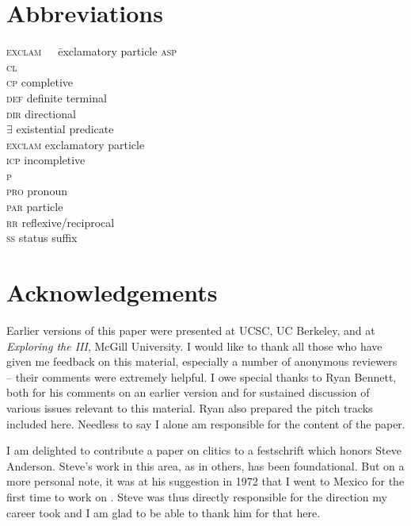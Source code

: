 \documentclass[output=paper,
modfonts
]{LSP/langsci}
\begin{document}
\section*{Abbreviations}
\begin{multicols}{2}
\begin{tabbing}
\textsc{exclam}~~~\= exclamatory particle \kill
\textsc{asp}\>  \\
\textsc{cl}\> \\
\textsc{cp}\> completive \\
\textsc{def}\> definite terminal \\
\textsc{dir}\> directional \\
$\exists$\> existential predicate \\
\textsc{exclam}\> exclamatory particle \\
\textsc{icp}\> incompletive \\
\textsc{p}\> \\
\textsc{pro}\> pronoun \\
\textsc{par}\> particle \\
\textsc{rr}\> reflexive/reciprocal \\
\textsc{ss}\> status suffix \\
\end{tabbing}
\end{multicols}


\section*{Acknowledgements}
Earlier versions of this paper were presented at UCSC, UC Berkeley, and at \emph{Exploring the  III}, McGill University. 
I would like to thank all those who have given me feedback on this material, especially a number of anonymous reviewers  -- 
their comments were extremely helpful. I owe special thanks to Ryan Bennett, both for his comments on an earlier version and for
 sustained discussion of various issues relevant to this material. Ryan also prepared the pitch tracks included here. Needless to say
 I alone am responsible for the content of the paper.
 
I am delighted to contribute a paper on clitics to a festschrift which honors Steve Anderson. Steve's work in this area, as in others, has been
foundational. But on a more personal note, it was at his suggestion in 1972 that I went to Mexico for the first time to work on . 
Steve was thus directly responsible for the direction my career took and I am glad to be able to thank him for that here.

{\sloppy
\printbibliography[heading=subbibliography,notkeyword=this]
}
\end{document}
